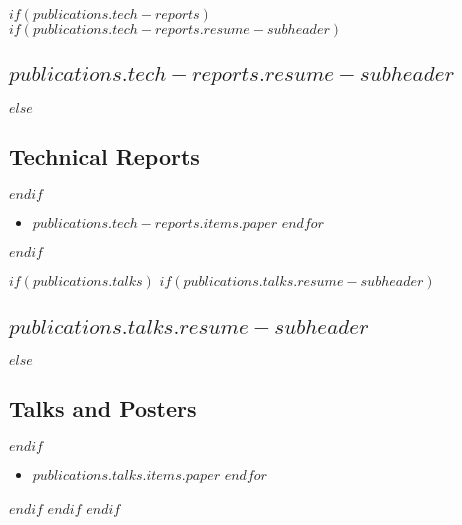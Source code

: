 \documentclass[letterpaper,10pt,final]{moderncv}
\begin{document}
$if(publications.tech-reports)$
$if(publications.tech-reports.resume-subheader)$
\subsection{$publications.tech-reports.resume-subheader$}
$else$
\subsection{Technical Reports}
$endif$
\begin{itemize}
$for(publications.tech-reports.items)$
\item $publications.tech-reports.items.paper$
$endfor$
\end{itemize}
$endif$

$if(publications.talks)$
$if(publications.talks.resume-subheader)$
\subsection{$publications.talks.resume-subheader$}
$else$
\subsection{Talks and Posters}
$endif$
\begin{itemize}
$for(publications.talks.items)$
\item $publications.talks.items.paper$
$endfor$
\end{itemize}
$endif$
$endif$
$endif$

\end{document}
